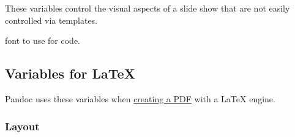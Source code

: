 \documentclass[
  b5paper
]{book}
\providecommand{\tightlist}{%
  \setlength{\itemsep}{0pt}\setlength{\parskip}{0pt}}
\begin{document}
These variables control the visual aspects of a slide show that are not
easily controlled via templates.

\begin{description}
\tightlist
\item[\texttt{monofont}]
font to use for code.
\end{description}

\subsection{Variables for LaTeX}\label{variables-for-latex}

Pandoc uses these variables when \hyperref[creating-a-pdf]{creating a
PDF} with a LaTeX engine.

\subsubsection{Layout}\label{layout}
\end{document}
